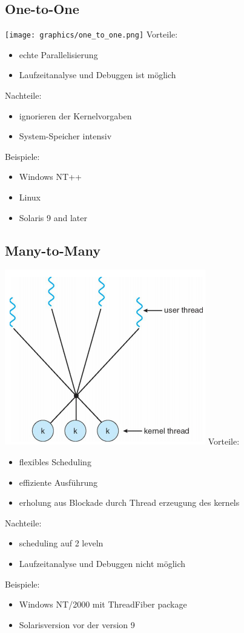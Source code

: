\documentclass[a4paper]{scrreprt}
\begin{document}
	\subsection{One-to-One}
		\texttt{[image: graphics/one\_to\_one.png]}
		Vorteile:
		\begin{itemize}
			\item echte Parallelisierung
			\item Laufzeitanalyse und Debuggen ist möglich
		\end{itemize}
		Nachteile:
		\begin{itemize}
			\item ignorieren der Kernelvorgaben
			\item System-Speicher intensiv
		\end{itemize}
		Beispiele:
		\begin{itemize}
			\item Windows NT++
			\item Linux
			\item Solaris 9 and later
		\end{itemize}
		
	\subsection{Many-to-Many}
		\includegraphics[scale = 0.6]{graphics/many_to_many.png}
		Vorteile:
		\begin{itemize}
			\item flexibles Scheduling
			\item effiziente Ausführung
			\item erholung aus Blockade durch Thread erzeugung des kernels
		\end{itemize}
		Nachteile:
		\begin{itemize}
			\item scheduling auf 2 leveln
			\item Laufzeitanalyse und Debuggen nicht möglich
		\end{itemize}
		Beispiele:
		\begin{itemize}
			\item Windows NT/2000 mit ThreadFiber package
			\item Solarisversion vor der version 9
		\end{itemize}
			
\end{document}
